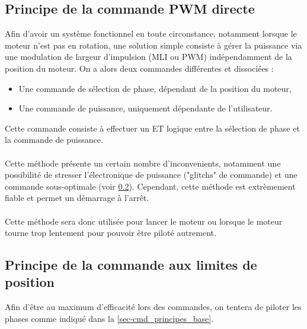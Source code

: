 \subsection{Principe de la commande PWM directe}

Afin d'avoir un système fonctionnel en toute circonstance, notamment lorsque le moteur n'est pas en rotation, 
une solution simple consiste à gérer la puissance via une modulation de largeur d'impulsion (MLI ou PWM) indépendamment de la position du moteur.
On a alors deux commandes différentes et dissociées :
\begin{itemize}
    \item Une commande de sélection de phase, dépendant de la position du moteur,
    \item Une commande de puissance, uniquement dépendante de l'utilisateur.
\end{itemize}

Cette commande consiste à effectuer un ET logique entre la sélection de phase et la commande de puissance.

\paragraph{}
Cette méthode présente un certain nombre d'inconvenients, notamment une possibilité de stresser l'électronique de puissance ("glitchs" de commande) et une commande sous-optimale (voir \cref{sec-cmd_limite_position}).
Cependant, cette méthode est extrèmement fiable et permet un démarrage à l'arrêt. 

\paragraph{}
Cette méthode sera donc utilisée pour lancer le moteur ou lorsque le moteur tourne trop lentement pour pouvoir être piloté autrement.

\subsection{Principe de la commande aux limites de position}
\label{sec-cmd_limite_position}
Afin d'être au maximum d'efficacité lors des commandes, on tentera de piloter les phases comme indiqué dans la \cref{sec-cmd_principes_base}.

